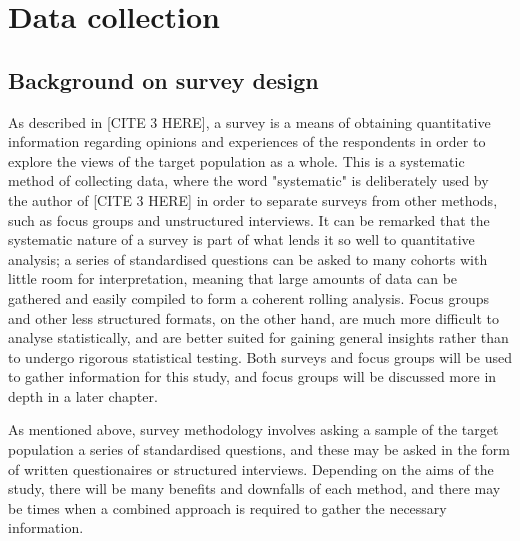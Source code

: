 \chapter{Data collection}

\section{Background on survey design}




As described in [CITE 3 HERE], a survey is a means of obtaining quantitative information regarding opinions and 
experiences of the respondents in order to explore the views of the target population as a whole. This is a systematic
method of collecting data, where the word "systematic" is deliberately used by the author of [CITE 3 HERE] in order to separate
surveys from other methods, such as focus groups and unstructured interviews. It can be remarked that the systematic nature of
a survey is part of what lends it so well to quantitative analysis; a series of standardised questions can be asked to many
cohorts with little room for interpretation, meaning that large amounts of data can be gathered and easily compiled to
form a coherent rolling analysis. Focus groups and other less structured formats, on the other hand, are much more difficult 
to analyse statistically, and are better suited for gaining general insights rather than to undergo rigorous statistical 
testing. Both surveys and focus groups will be used to gather information for this study, and focus groups will be discussed 
more in depth in a later chapter.

As mentioned above, survey methodology involves asking a sample of the target population a series of standardised questions, 
and these may be asked in the form of written questionaires or structured interviews. Depending on the aims of the study, there
will be many benefits and downfalls of each method, and there may be times when a combined approach is required to
gather the necessary information. 

